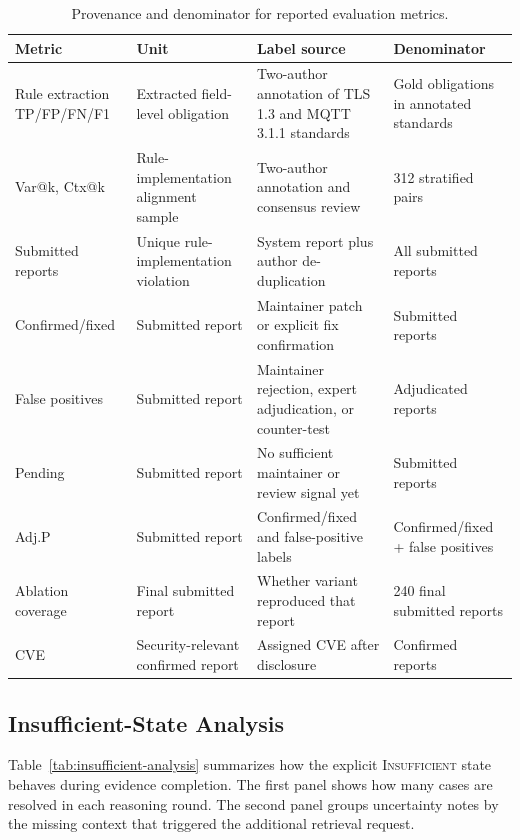 \begin{table}[t]
\centering
\caption{Provenance and denominator for reported evaluation metrics.}
\label{tab:metric-provenance}
\small
\begin{tabular}{p{}p{}p{}p{}}
\toprule
\textbf{Metric} & \textbf{Unit} & \textbf{Label source} & \textbf{Denominator} \\
\midrule
Rule extraction TP/FP/FN/F1 & Extracted field-level obligation & Two-author annotation of TLS 1.3 and MQTT 3.1.1 standards & Gold obligations in annotated standards \\
Var@k, Ctx@k & Rule-implementation alignment sample & Two-author annotation and consensus review & 312 stratified pairs \\
Submitted reports & Unique rule-implementation violation & System report plus author de-duplication & All submitted reports \\
Confirmed/fixed & Submitted report & Maintainer patch or explicit fix confirmation & Submitted reports \\
False positives & Submitted report & Maintainer rejection, expert adjudication, or counter-test & Adjudicated reports \\
Pending & Submitted report & No sufficient maintainer or review signal yet & Submitted reports \\
Adj.P & Submitted report & Confirmed/fixed and false-positive labels & Confirmed/fixed + false positives \\
Ablation coverage & Final submitted report & Whether variant reproduced that report & 240 final submitted reports \\
CVE & Security-relevant confirmed report & Assigned CVE after disclosure & Confirmed reports \\
\bottomrule
\end{tabular}
\end{table}

\subsection{Insufficient-State Analysis}

Table~\ref{tab:insufficient-analysis} summarizes how the explicit
\textsc{Insufficient} state behaves during evidence completion. The first panel
shows how many cases are resolved in each reasoning round. The second panel
groups uncertainty notes by the missing context that triggered the additional
retrieval request.

